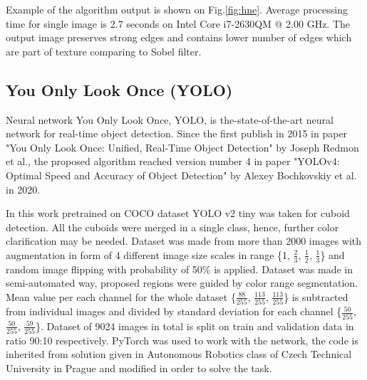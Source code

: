 \documentclass{ctuthesis}
\begin{document}
Example of the algorithm output is shown on Fig.\ref{fig:hne}. Average processing time for single image is 2.7 seconds on Intel Core i7-2630QM @ 2.00 GHz. The output image preserves strong edges and contains lower number of edges which are part of texture comparing to Sobel filter.

\subsection{You Only Look Once (YOLO)}

Neural network You Only Look Once, YOLO, is the-state-of-the-art neural network for real-time object detection. Since the first publish in 2015 in paper "You Only Look Once: Unified, Real-Time Object Detection" by Joseph Redmon et al., the proposed algorithm reached version number 4 in paper "YOLOv4: Optimal Speed and Accuracy of Object Detection" by Alexey Bochkovskiy et al. in 2020.

In this work pretrained on COCO dataset YOLO v2 tiny was taken for cuboid detection. All the cuboids were merged in a single class, hence, further color clarification may be needed. Dataset was made from more than 2000 images with augmentation in form of 4 different image size scales in range \{1, $\frac{2}{3}$, $\frac{1}{2}$, $\frac{1}{3}$\} and random image flipping with probability of 50\% is applied. Dataset was made in semi-automated way, proposed regions were guided by color range segmentation. Mean value per each channel for the whole dataset \{$\frac{88}{255}$, $\frac{113}{255}$, $\frac{113}{255}$\} is subtracted from individual images and divided by standard deviation for each channel \{$\frac{50}{255}$, $\frac{50}{255}$, $\frac{59}{255}$\}. Dataset of 9024 images in total is split on train and validation data in ratio 90:10 respectively. PyTorch was used to work with the network, the code is inherited from solution given in Autonomous Robotics class of Czech Technical University in Prague and modified in order to solve the task.
\end{document}
